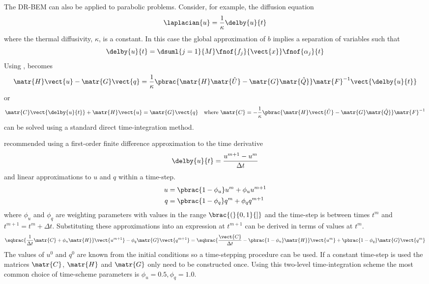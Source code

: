 The DR-BEM can also be applied to parabolic problems. Consider, 
for example, the diffusion equation
\begin{equation}
\laplacian{u}  = \dfrac{1}{\kappa} \delby{u}{t}
\end{equation}
where the thermal diffusivity, $\kappa$, is a constant.  In this case the
global approximation of $b$ implies a separation of variables such that
\begin{equation}
\delby{u}{t} = \dsuml{j=1}{M} \fnof{f_{j}}{\vect{x}} \fnof{\alpha_{j}}{t}
\label{eq:sovapprox}
\end{equation}
Using ,  becomes
\begin{equation}
  \matr{H} \vect{u} - \matr{G} \vect{q} = \dfrac{1}{\kappa} \pbrac{\matr{H}
    \matr{\hat{U}} - \matr{G} \matr{\hat{Q}}} \matr{F}^{-1}
  \vect{\delby{u}{t}}
\end{equation}
or
\begin{equation}
  \matr{C} \vect{\delby{u}{t}} + \matr{H} \vect{u} = \matr{G}
  \vect{q}\quad\text{where }\matr{C} = -\dfrac{1}{\kappa}
  \pbrac{\matr{H} \vect{\hat{U}} - \matr{G} \matr{\hat{Q}}} \matr{F}^{-1}
\label{eq:drmtransient}
\end{equation}
 can be solved using a standard direct
time-integration method.

\citet{partridge:1990} recommended using a first-order finite difference
approximation to the time derivative 
\begin{equation}
\delby{u}{t} = \dfrac{u^{m+1} - u^{m}}{\Delta t}
\end{equation}
and linear approximations to $u$ and $q$ within a time-step.
\begin{align}
u & = \pbrac{1 - \phi_{u}} u^{m} + \phi_{u} u^{m+1} \\
q & = \pbrac{1 - \phi_{q}} q^{m} + \phi_{q} q^{m+1}
\end{align}
where $\phi_{u}$ and $\phi_{q}$ are weighting parameters with values in the
range $\brac{(}{0,1}{]}$ and the time-step is between times $t^{m}$ and $t^{m+1} =
t^{m} + \Delta t$.  Substituting these approximations into
 an expression at $t^{m+1}$ can be derived in terms
of values at $t^{m}$.
\begin{equation}
  \sqbrac{\dfrac{1}{\Delta t} \matr{C} + \phi_{u} \matr{H}} \vect{u^{m+1}} -
  \phi_{q} \matr{G} \vect{q^{m+1}} = \sqbrac{\dfrac{\vect{C}}{\Delta t} -
    \pbrac{1-\phi_{u}} \matr{H}} \vect{u^{m}} + \pbrac{1 - \phi_{q}} \matr{G}
  \vect{q^{m}}
\end{equation}
The values of $u^{0}$ and $q^{0}$ are known from the initial conditions so
a time-stepping procedure can be used.  If a constant time-step is used the
matrices $\matr{C}$, $\matr{H}$ and $\matr{G}$ only need to be constructed
once.  Using this two-level time-integration scheme the most common choice
of time-scheme parameters is $\phi_{u} = 0.5, \phi_{q} = 1.0$.

